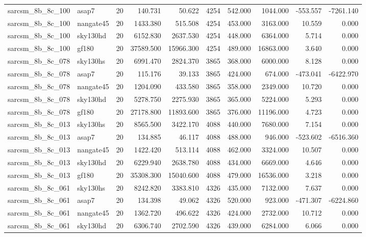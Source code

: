 \begin{tabular}{llrrrrrrrr}
sarcsm\_8b\_8c\_100 & asap7 & 20 & 140.731 & 50.622 & 4254 & 542.000 & 1044.000 & -553.557 & -7261.140 \\
sarcsm\_8b\_8c\_100 & nangate45 & 20 & 1433.380 & 515.508 & 4254 & 453.000 & 3163.000 & 10.559 & 0.000 \\
sarcsm\_8b\_8c\_100 & sky130hd & 20 & 6152.830 & 2637.530 & 4254 & 448.000 & 6364.000 & 5.714 & 0.000 \\
sarcsm\_8b\_8c\_100 & gf180 & 20 & 37589.500 & 15966.300 & 4254 & 489.000 & 16863.000 & 3.640 & 0.000 \\
sarcsm\_8b\_8c\_078 & sky130hs & 20 & 6991.470 & 2824.370 & 3865 & 368.000 & 6000.000 & 8.128 & 0.000 \\
sarcsm\_8b\_8c\_078 & asap7 & 20 & 115.176 & 39.133 & 3865 & 424.000 & 674.000 & -473.041 & -6422.970 \\
sarcsm\_8b\_8c\_078 & nangate45 & 20 & 1204.090 & 433.580 & 3865 & 358.000 & 2349.000 & 10.720 & 0.000 \\
sarcsm\_8b\_8c\_078 & sky130hd & 20 & 5278.750 & 2275.930 & 3865 & 365.000 & 5224.000 & 5.293 & 0.000 \\
sarcsm\_8b\_8c\_078 & gf180 & 20 & 27178.800 & 11893.600 & 3865 & 376.000 & 11196.000 & 4.723 & 0.000 \\
sarcsm\_8b\_8c\_013 & sky130hs & 20 & 8565.500 & 3422.170 & 4088 & 440.000 & 7680.000 & 7.154 & 0.000 \\
sarcsm\_8b\_8c\_013 & asap7 & 20 & 134.885 & 46.117 & 4088 & 488.000 & 946.000 & -523.602 & -6516.360 \\
sarcsm\_8b\_8c\_013 & nangate45 & 20 & 1422.420 & 513.114 & 4088 & 462.000 & 3324.000 & 10.507 & 0.000 \\
sarcsm\_8b\_8c\_013 & sky130hd & 20 & 6229.940 & 2638.780 & 4088 & 434.000 & 6669.000 & 4.646 & 0.000 \\
sarcsm\_8b\_8c\_013 & gf180 & 20 & 35308.300 & 15040.600 & 4088 & 479.000 & 16536.000 & 3.218 & 0.000 \\
sarcsm\_8b\_8c\_061 & sky130hs & 20 & 8242.820 & 3383.810 & 4326 & 435.000 & 7132.000 & 7.637 & 0.000 \\
sarcsm\_8b\_8c\_061 & asap7 & 20 & 134.398 & 49.062 & 4326 & 520.000 & 923.000 & -471.307 & -6224.860 \\
sarcsm\_8b\_8c\_061 & nangate45 & 20 & 1362.720 & 496.622 & 4326 & 424.000 & 2732.000 & 10.712 & 0.000 \\
sarcsm\_8b\_8c\_061 & sky130hd & 20 & 6306.740 & 2702.590 & 4326 & 439.000 & 6284.000 & 6.066 & 0.000 \\

\end{tabular}
